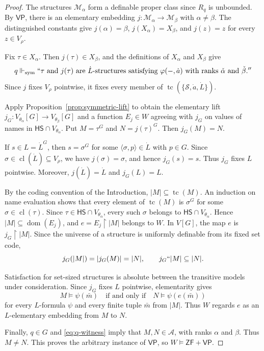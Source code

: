 \documentclass[11pt,a4paper]{amsart}
\newcommand{\VP}{\mathsf{VP}}
\newcommand{\ZF}{\mathsf{ZF}}
\newcommand{\HS}{\mathsf{HS}}
\newcommand{\tc}{\operatorname{tc}}
\newcommand{\forcesS}{\Vdash_{\mathrm{sym}}}
\newcommand{\restr}{\mathbin{\upharpoonright}}
\theoremstyle{plain}
\theoremstyle{definition}
\theoremstyle{remark}
\begin{document}
\begin{proof}
The structures $\mathcal M_\alpha$ form a definable proper class since $R_q$ is unbounded.  By $\VP$, there is an elementary embedding $j:\mathcal M_\alpha\to\mathcal M_\beta$ with $\alpha\ne\beta$.  The distinguished constants give $j(\alpha)=\beta$, $j(X_\alpha)=X_\beta$, and $j(z)=z$ for every $z\in V_\rho$.

Fix $\tau\in X_\alpha$.  Then $j(\tau)\in X_\beta$, and the definitions of $X_\alpha$ and $X_\beta$ give
\begin{equation}\label{eq:q-witness}
q\forcesS ``\tau\text{ and }j(\tau)\text{ are }\dot L\text{-structures satisfying }
\varphi(-,\dot a)\text{ with ranks }\check\alpha\text{ and }\check\beta.''
\end{equation}
Since $j$ fixes $V_\rho$ pointwise, it fixes every member of $\tc(\{\mathscr S,\dot a,\dot L\})$.

Apply Proposition~\ref{prop:symmetric-lift} to obtain the elementary lift
$j_G:V_{\theta_\alpha}[G]\to V_{\theta_\beta}[G]$ and a function $E_j\in W$ agreeing with $j_G$ on values of names in $\HS\cap V_{\theta_\alpha}$.  Put $M=\tau^G$ and $N=j(\tau)^G$.  Then $j_G(M)=N$.

If $s\in L=\dot L^G$, then $s=\sigma^G$ for some $\langle\sigma,p\rangle\in\dot L$ with $p\in G$.  Since $\sigma\in\operatorname{cl}(\dot L)\subseteq V_\rho$, we have $j(\sigma)=\sigma$, and hence $j_G(s)=s$.  Thus $j_G$ fixes $L$ pointwise.  Moreover, $j(\dot L)=\dot L$ and $j_G(L)=L$.

By the coding convention of the Introduction, $\lvert M\rvert\subseteq\tc(M)$.  An induction on name evaluation shows that every element of $\tc(M)$ is $\sigma^G$ for some $\sigma\in\operatorname{cl}(\tau)$.  Since $\tau\in\HS\cap V_{\theta_\alpha}$, every such $\sigma$ belongs to $\HS\cap V_{\theta_\alpha}$.  Hence $|M|\subseteq\operatorname{dom}(E_j)$, and $e=E_j\restr|M|$ belongs to $W$.  In $V[G]$, the map $e$ is $j_G\restr|M|$.  Since the universe of a structure is uniformly definable from its fixed set code,
\[
j_G(|M|)=|j_G(M)|=|N|,
\qquad j_G``|M|\subseteq|N|.
\]

{Satisfaction for set-sized structures is absolute between the transitive models under consideration.  Since $j_G$ fixes $L$ pointwise, elementarity gives}
\[
M\models\psi(\bar m)\quad\text{if and only if}\quad
N\models\psi(e(\bar m))
\]
{for every $L$-formula $\psi$ and every finite tuple $\bar m$ from $|M|$.  Thus $W$ regards $e$ as an $L$-elementary embedding from $M$ to $N$.}

Finally, $q\in G$ and \eqref{eq:q-witness} imply that $M,N\in\mathcal A$, with ranks $\alpha$ and $\beta$.  Thus $M\neq N$.  This proves the arbitrary instance of $\VP$, so $W\models\ZF+\VP$.
\end{proof}
\end{document}
